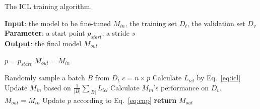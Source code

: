 \begin{algorithm}[tb]
	\caption{The ICL training algorithm.}
	\label{alg:picl}
	\small
	\textbf{Input}: the model to be fine-tuned $M_{in}$, the training set $D_t$, the validation set $D_v$\\
	\textbf{Parameter}: a start point $p_{start}$, a stride $s$\\
	\textbf{Output}: the final model $M_{out}$
	\begin{algorithmic}[1] %
		\State $p = p_{start}$ 
		\State $M_{out}=M_{in}$ 
			
			\State {}
				\State Randomly sample a batch $B$ from $D_t$
					\State $c = n\times p$
					\State Calculate $L_{icl}$ by Eq.~\ref{eq:icl}
				\EndFor
				\State Update $M_{in}$ based on $\frac{1}{|B|}\sum_{|B|}L_{icl}$
			\EndFor
			\State {}
			\State Calculate $M_{in}$'s performance on $D_v$.
				\State $M_{out} = M_{in}$
			\Else
				\State Update $p$ according to Eq.~\ref{eq:cnp}
			\EndIf
		\EndFor	
		\State \textbf{return} $M_{out}$
	
		\EndProcedure
	\end{algorithmic}

\end{algorithm}


